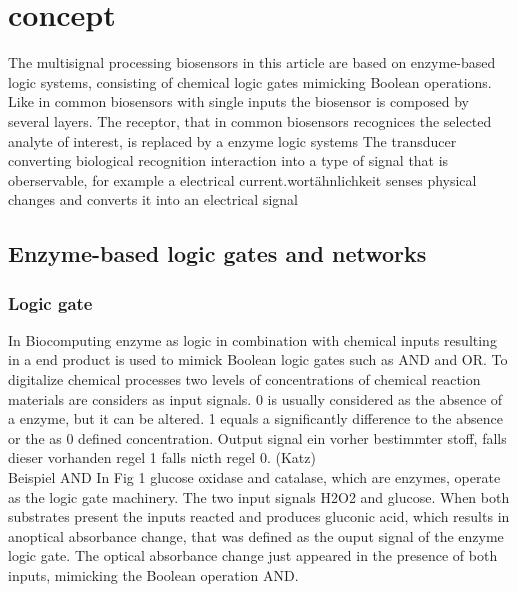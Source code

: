\documentclass[runningheads]{llncs}
\begin{document}
\section{concept}

The multisignal processing biosensors in this article are based on enzyme-based logic systems, consisting of chemical logic gates mimicking Boolean operations. Like in common biosensors with single inputs the biosensor is composed by several layers. The receptor, that in common biosensors recognices the selected analyte of interest, is replaced by a enzyme logic systems
The transducer converting biological recognition interaction into a type of signal that is oberservable, for example a electrical current.wortähnlichkeit senses physical changes and converts it into an electrical signal

\subsection{Enzyme-based logic gates and networks}
	
	\subsubsection{Logic gate}
	
	In Biocomputing enzyme as logic in combination with chemical inputs resulting in a end product is used to mimick Boolean logic gates such as AND and OR. To digitalize chemical processes two levels of concentrations of chemical reaction materials are considers as input signals. 0 is usually considered as the absence of a enzyme, but it can be altered. 1 equals a  significantly difference to the absence or the as 0 defined concentration.
	Output signal ein vorher bestimmter stoff, falls dieser vorhanden regel 1 falls nicth regel 0.  
	(Katz) \\
	
	Beispiel AND 
	In Fig 1 glucose oxidase and catalase, which are enzymes, operate as the logic gate machinery. The two input signals H2O2 and glucose. When both substrates present the inputs reacted and produces gluconic acid, which results in anoptical absorbance change, that was defined as the ouput signal of the enzyme logic gate. The optical absorbance change just appeared in the presence of both inputs, mimicking the Boolean operation AND. 
\end{document}
